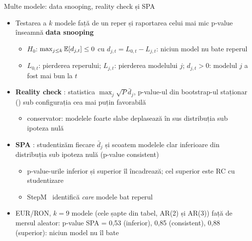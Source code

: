 \begin{frame}{Multe modele: data snooping, reality check și SPA}
\itemsize{\small}
\begin{itemize}
    \item Testarea a $k$ modele față de un reper și raportarea celui mai mic p-value înseamnă \textbf{data snooping}
    \begin{itemize}
        \item $H_0$: $\max_{j \le k}\mathbb{E}[d_{j,t}] \le 0$ cu $d_{j,t} = L_{0,t} - L_{j,t}$: niciun model nu bate reperul
        \item $L_{0,t}$: pierderea reperului; $L_{j,t}$: pierderea modelului $j$; $d_{j,t} > 0$: modelul $j$ a fost mai bun la $t$
    \end{itemize}
    \item \textbf{Reality check} : statistica $\max_j\sqrt P\bar d_j$, p-value-ul din bootstrap-ul staționar () sub configurația cea mai puțin favorabilă
    \begin{itemize}
        \item conservator: modelele foarte slabe deplasează în sus distribuția sub ipoteza nulă
    \end{itemize}
    \item \textbf{SPA} : studentizăm fiecare $\bar d_j$ și scoatem modelele clar inferioare din distribuția sub ipoteza nulă (p-value consistent)
    \begin{itemize}
        \item p-value-urile inferior și superior îl încadrează; cel superior este RC cu studentizare
        \item StepM \ identifică \emph{care} modele bat reperul
    \end{itemize}
    \item EUR/RON, $k = 9$ modele (cele șapte din tabel, AR(2) și AR(3)) față de mersul aleator: p-value SPA = 0{,}53 (inferior), 0{,}85 (consistent), 0{,}88 (superior): niciun model nu îl bate
\end{itemize}
\end{frame}

